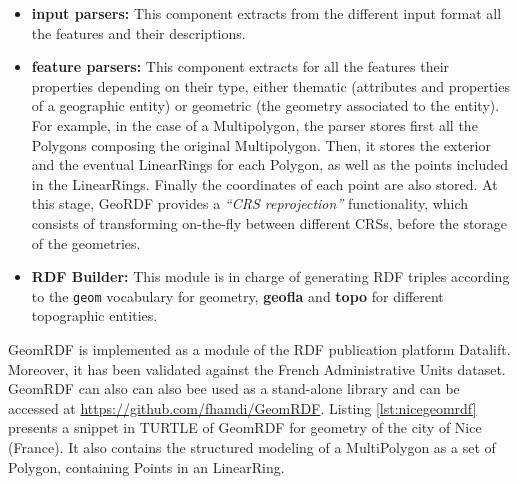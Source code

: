 \begin{itemize}
\item \textbf{input parsers:} This component extracts from the different input format all the features and their descriptions. 
\item \textbf{feature parsers:} This component extracts for all the features their properties depending on their type, either thematic (attributes and properties of a geographic entity) or geometric (the geometry associated to the entity). For example, in the case of a Multipolygon, the parser stores first all the Polygons composing the original Multipolygon. Then, it stores the exterior and the eventual LinearRings for each Polygon, as well as the points included in the LinearRings. Finally the coordinates of each point are also stored. At this stage, GeoRDF provides a \textit{``CRS reprojection''} functionality, which consists of transforming on-the-fly between different CRSs, before the storage of the geometries.

\item  \textbf{RDF Builder:} This module is in charge of generating RDF triples according to the \texttt{geom} vocabulary for geometry, \textbf{geofla} and \textbf{topo} for different topographic entities.  


\end{itemize}

GeomRDF is implemented as a module of the RDF publication platform Datalift. Moreover, it has been validated against the French Administrative Units dataset. GeomRDF can also can also bee used as a stand-alone library and can be accessed at \url{https://github.com/fhamdi/GeomRDF}. Listing \ref{lst:nicegeomrdf} presents a snippet in TURTLE of GeomRDF for geometry of the city of Nice (France). It also contains the structured modeling of a MultiPolygon as a set of Polygon, containing Points in an LinearRing. 



